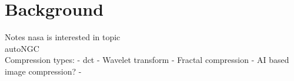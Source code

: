 \section{Background}
Notes
\gls{nasa} is interested in topic\\
autoNGC\\

Compression types:
    - \gls{dct}
    - Wavelet transform
    - Fractal compression
    - AI based image compression?
    - 